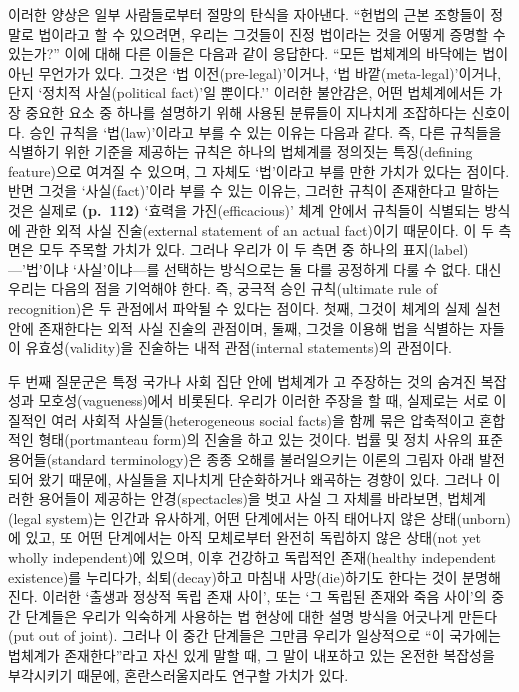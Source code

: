 이러한 양상은 일부 사람들로부터 절망의 탄식을 자아낸다. ``헌법의 근본
조항들이 정말로 법이라고 할 수 있으려면, 우리는 그것들이 진정 법이라는
것을 어떻게 증명할 수 있는가?'' 이에 대해 다른 이들은 다음과 같이
응답한다. ``모든 법체계의 바닥에는 법이 아닌 무언가가 있다. 그것은 `법
이전(pre-legal)'이거나, `법 바깥(meta-legal)'이거나, 단지 `정치적
사실(political fact)'일 뿐이다.'' 이러한 불안감은, 어떤 법체계에서든
가장 중요한 요소 중 하나를 설명하기 위해 사용된 분류들이 지나치게
조잡하다는 신호이다. 승인 규칙을 `법(law)'이라고 부를 수 있는 이유는
다음과 같다. 즉, 다른 규칙들을 식별하기 위한 기준을 제공하는 규칙은
하나의 법체계를 정의짓는 특징(defining feature)으로 여겨질 수 있으며, 그
자체도 `법'이라고 부를 만한 가치가 있다는 점이다. 반면 그것을
`사실(fact)'이라 부를 수 있는 이유는, 그러한 규칙이 존재한다고 말하는
것은 실제로 \textbf{(p.~112)} `효력을 가진(efficacious)' 체계 안에서
규칙들이 식별되는 방식에 관한 외적 사실 진술(external statement of an
actual fact)이기 때문이다. 이 두 측면은 모두 주목할 가치가 있다. 그러나
우리가 이 두 측면 중 하나의 표지(label)---'법'이냐 `사실'이냐---를
선택하는 방식으로는 둘 다를 공정하게 다룰 수 없다. 대신 우리는 다음의
점을 기억해야 한다. 즉, 궁극적 승인 규칙(ultimate rule of recognition)은
두 관점에서 파악될 수 있다는 점이다. 첫째, 그것이 체계의 실제 실천 안에
존재한다는 외적 사실 진술의 관점이며, 둘째, 그것을 이용해 법을 식별하는
자들이 유효성(validity)을 진술하는 내적 관점(internal statements)의
관점이다.

두 번째 질문군은 특정 국가나 사회 집단 안에 법체계가
고 주장하는 것의 숨겨진 복잡성과
모호성(vagueness)에서 비롯된다. 우리가 이러한 주장을 할 때, 실제로는
서로 이질적인 여러 사회적 사실들(heterogeneous social facts)을 함께 묶은
압축적이고 혼합적인 형태(portmanteau form)의 진술을 하고 있는 것이다.
법률 및 정치 사유의 표준 용어들(standard terminology)은 종종 오해를
불러일으키는 이론의 그림자 아래 발전되어 왔기 때문에, 사실들을 지나치게
단순화하거나 왜곡하는 경향이 있다. 그러나 이러한 용어들이 제공하는
안경(spectacles)을 벗고 사실 그 자체를 바라보면, 법체계(legal system)는
인간과 유사하게, 어떤 단계에서는 아직 태어나지 않은 상태(unborn)에 있고,
또 어떤 단계에서는 아직 모체로부터 완전히 독립하지 않은 상태(not yet
wholly independent)에 있으며, 이후 건강하고 독립적인 존재(healthy
independent existence)를 누리다가, 쇠퇴(decay)하고 마침내
사망(die)하기도 한다는 것이 분명해진다. 이러한 `출생과 정상적 독립 존재
사이', 또는 `그 독립된 존재와 죽음 사이'의 중간 단계들은 우리가 익숙하게
사용하는 법 현상에 대한 설명 방식을 어긋나게 만든다(put out of joint).
그러나 이 중간 단계들은 그만큼 우리가 일상적으로 ``이 국가에는 법체계가
존재한다''라고 자신 있게 말할 때, 그 말이 내포하고 있는 온전한 복잡성을
부각시키기 때문에, 혼란스러울지라도 연구할 가치가 있다.

